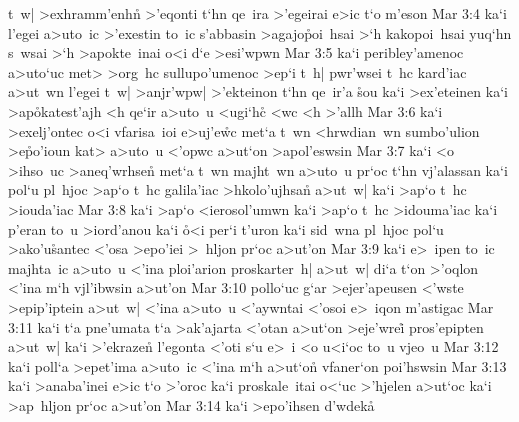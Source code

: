 t~w|
>exhramm'enhn\r{}
>'eqonti
t`hn
qe~ira
>'egeirai
e>ic
t`o
m'eson\bibvsend
\vs Mar 3:4
ka`i
l'egei
a>uto~ic
>'exestin
to~ic
s'abbasin
>agajo\r{p}oi~hsai
>`h
kakopoi~hsai
yuq`hn
s~wsai
>`h
>apokte~inai
o<i
d`e
>esi'wpwn\bibvsend
\vs Mar 3:5
ka`i
peribley'amenoc
a>uto`uc
met>
>org~hc
sullupo'umenoc
>ep`i
t~h|
pwr'wsei
t~hc
kard'iac
a>ut~wn
l'egei
t~w|
>anjr'wpw|
>'ekteinon
t`hn
qe~ir'a
\r{s}ou
ka`i
>ex'eteinen
ka`i
>ap\r{o}katest'ajh
<h
qe`ir
a>uto~u
<ugi`hc\r{}
<wc
<h
>'allh\bibvsend
\vs Mar 3:6
ka`i
>exelj'ontec
o<i
vfarisa~ioi
e>uj'e\r{w}c
met`a
t~wn
<hrwdian~wn
sumbo'ulion
>e\r{p}o'ioun
kat>
a>uto~u
<'opwc
a>ut`on
>apol'eswsin\bibvsend
\vs Mar 3:7
ka`i
<o
>ihso~uc
>aneq'wrhsen\r{}
met`a
t~wn
majht~wn
a>uto~u
pr`oc
t`hn
vj'alassan
ka`i
pol`u
pl~hjoc
>ap`o
t~hc
galila'iac
>hkolo'ujhsan\r{}
a>ut~w|
ka`i
>ap`o
t~hc
>iouda'iac\bibvsend
\vs Mar 3:8
ka`i
>ap`o
<ierosol'umwn
ka`i
>ap`o
t~hc
>idouma'iac
ka`i
p'eran
to~u
>iord'anou
ka`i
\r{o}<i
per`i
t'uron
ka`i
sid~wna
pl~hjoc
pol`u
>ako'u\r{s}antec
<'osa
>epo'iei
>~hljon
pr`oc
a>ut'on\bibvsend
\vs Mar 3:9
ka`i
e>~ipen
to~ic
majhta~ic
a>uto~u
<'ina
ploi'arion
proskarter~h|
a>ut~w|
di`a
t`on
>'oqlon
<'ina
m`h
vjl'ibwsin
a>ut'on\bibvsend
\vs Mar 3:10
pollo`uc
g`ar
>ejer'apeusen
<'wste
>epip'iptein
a>ut~w|
<'ina
a>uto~u
<'aywntai
<'osoi
e>~iqon
m'astigac\bibvsend
\vs Mar 3:11
ka`i
t`a
pne'umata
t`a
>ak'ajarta
<'otan
a>ut`on
>eje'wrei\r{}
pros'epipten
a>ut~w|
ka`i
>'ekrazen\r{}
l'egonta
<'oti
s`u
e>~i
<o
u<i`oc
to~u
vjeo~u\bibvsend
\vs Mar 3:12
ka`i
poll`a
>epet'ima
a>uto~ic
<'ina
m`h
a>ut`on\r{}
vfaner`on
poi'hswsin\bibvsend
\vs Mar 3:13
ka`i
>anaba'inei
e>ic
t`o
>'oroc
ka`i
proskale~itai
o<`uc
>'hjelen
a>ut`oc
ka`i
>ap~hljon
pr`oc
a>ut'on\bibvsend
\vs Mar 3:14
ka`i
>epo'ihsen
d'wdek\r{a}

